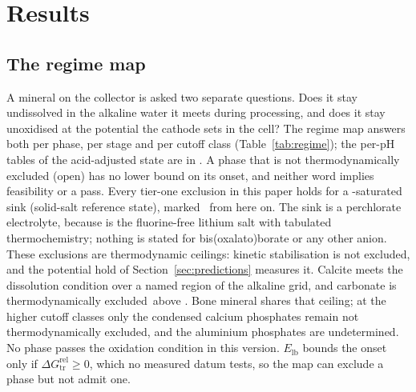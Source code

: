 \section{Results}\label{sec:results}

\subsection{The regime map}\label{sec:res-regime}
A mineral on the collector is asked two separate questions. %
Does it stay undissolved in the alkaline water it meets during processing, and does it stay unoxidised at the potential the cathode sets in the cell? %
The regime map answers both per phase, per stage and per cutoff class (Table~\ref{tab:regime}); the per-pH tables of the acid-adjusted state are in . %
A phase that is not thermodynamically excluded (open) has no lower bound on its onset, and neither word implies feasibility or a pass. %
Every tier-one exclusion in this paper holds for a -saturated sink (solid-salt reference state), marked \nacreSinkMark\ from here on. %
The sink is a perchlorate electrolyte, because  is the fluorine-free lithium salt with tabulated thermochemistry; nothing is stated for bis(oxalato)borate or any other anion. %
These exclusions are thermodynamic ceilings: kinetic stabilisation is not excluded, and the potential hold of Section~\ref{sec:predictions} measures it. %
Calcite meets the dissolution condition over a named region of the alkaline grid, and carbonate is thermodynamically excluded\nacreExcludedMark\nacreSinkMark\ above \NumCarbonateCrossover. %
Bone mineral shares that ceiling; at the higher cutoff classes only the condensed calcium phosphates remain not thermodynamically excluded, and the aluminium phosphates are undetermined. %
No phase passes the oxidation condition in this version. %
$E_\mathrm{lb}$ bounds the onset only if $\Delta G_\mathrm{tr}^\mathrm{rel}\ge0$, which no measured datum tests, so the map can exclude a phase but not admit one. %

